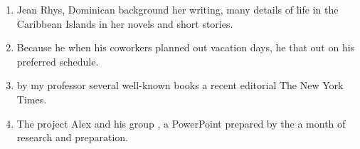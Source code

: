 \begin{enumerate}
\vfill\item

\begin{inparaenum}[A]
Jean Rhys,  Dominican background  her writing,  many details of life in the Caribbean Islands  in her novels and short stories. 
\end{inparaenum}

\vfill\item

\begin{inparaenum}[A]
Because he  when his coworkers planned out  vacation days, he  that  out on his preferred schedule. 
\end{inparaenum}

\vfill\item

\begin{inparaenum}[A]
 by my professor  several well-known books  a recent editorial  The New York Times. 
\end{inparaenum}

\vfill\item

\begin{inparaenum}[A]
The project Alex and his group , a PowerPoint prepared by   the  a month of research and preparation. 
\end{inparaenum}
\end{enumerate}
\vfill
\pagebreak

